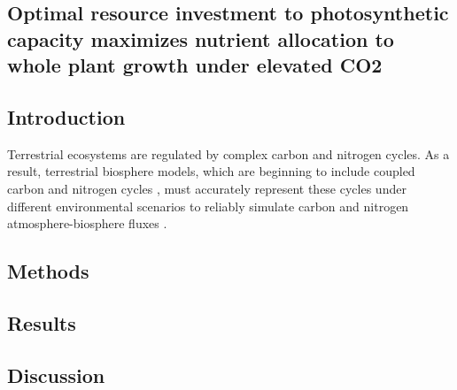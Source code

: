 \begin{singlespace}
    \chapter{\textbf{Optimal resource investment to photosynthetic capacity maximizes nutrient allocation to whole plant growth under elevated CO2}}
    \end{singlespace}
    
    \section{Introduction}

    Terrestrial ecosystems are regulated by complex carbon and nitrogen cycles. As a result, terrestrial biosphere models, which are beginning to include coupled carbon and nitrogen cycles , must accurately represent these cycles under different environmental scenarios to reliably simulate carbon and nitrogen atmosphere-biosphere fluxes . 

    \section{Methods}

    \section{Results}

    \section{Discussion}